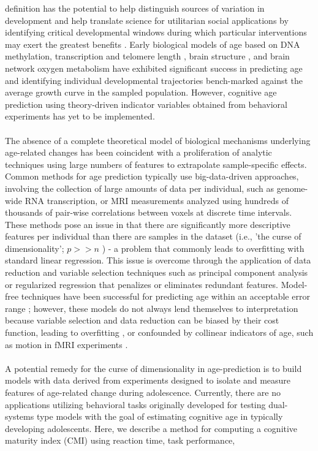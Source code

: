 \documentclass[utf8]{frontiersSCNS} %
\begin{document}
definition has the potential to help distinguish sources of variation in development and help translate science for utilitarian social applications by identifying critical developmental windows during which particular interventions may exert the greatest benefits \citep{somerville2016searching}. Early biological models of age based on DNA methylation, transcription and telomere length \citep{baker1988biomarkers, jylhava2017biological}, brain structure \citep{khundrakpam2015prediction,aycheh2018biological,madan2018predicting}, and brain network oxygen metabolism \citep{dosenbach2010prediction, qin2015predicting} have exhibited significant success in predicting age and identifying individual developmental trajectories bench-marked against the average growth curve in the sampled population. However, cognitive age prediction using theory-driven indicator variables obtained from behavioral experiments has yet to be implemented. \paragraph*{} The absence of a complete theoretical model of biological mechanisms underlying age-related changes has been coincident with a proliferation of analytic techniques using large numbers of features to extrapolate sample-specific effects. Common methods for age prediction typically use big-data-driven approaches, involving the collection of large amounts of data per individual, such as genome-wide RNA transcription, or MRI measurements analyzed using hundreds of thousands of pair-wise correlations between voxels at discrete time intervals. These methods pose an issue in that there are significantly more descriptive features per individual than there are samples in the dataset (i.e., 'the curse of dimensionality'; $p >> n$ \cite{taylor2019}) - a problem that commonly leads to overfitting with standard linear regression. This issue is overcome through the application of data reduction and variable selection techniques such as principal component analysis or regularized regression that penalizes or eliminates redundant features. Model-free techniques have been successful for predicting age within an acceptable error range \citep{cole2017predicting}; however, these models do not always lend themselves to interpretation because variable selection and data reduction can be biased by their cost function, leading to overfitting \citep{babyak2004you}, or confounded by collinear indicators of age, such as motion in fMRI experiments \citep{satterthwaite2013heterogeneous}. \paragraph*{} A potential remedy for the curse of dimensionality in age-prediction is to build models with data derived from experiments designed to isolate and measure features of age-related change during adolescence. Currently, there are no applications utilizing behavioral tasks originally developed for testing dual-systems type models with the goal of estimating cognitive age in typically developing adolescents. Here, we describe a method for computing a cognitive maturity index (CMI) using reaction time, task performance, 
\end{document}
